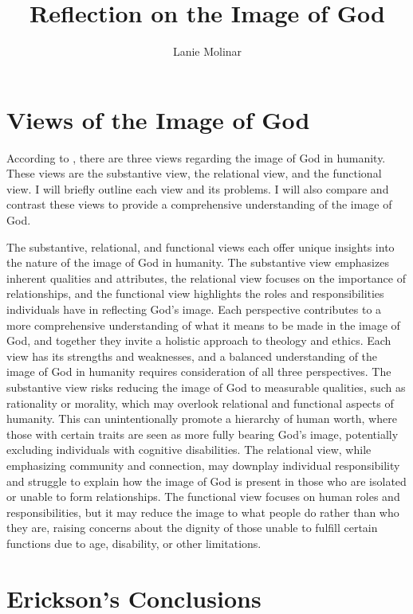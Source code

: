 \documentclass[stu,12pt,floatsintext]{apa7}
\title{Reflection on the Image of God}
\author{Lanie Molinar}
\begin{document}
\maketitle
\thispagestyle{plain}
\pagestyle{plain}

\section{Views of the Image of God}

According to \textcite[Chapter 18]{ericksonIntroducingChristianDoctrine2015}, there are three views regarding the image of God in humanity. These views are the substantive view, the relational view, and the functional view. I will briefly outline each view and its problems. I will also compare and contrast these views to provide a comprehensive understanding of the image of God.

The substantive, relational, and functional views each offer unique insights into the nature of the image of God in humanity. The substantive view emphasizes inherent qualities and attributes, the relational view focuses on the importance of relationships, and the functional view highlights the roles and responsibilities individuals have in reflecting God's image. Each perspective contributes to a more comprehensive understanding of what it means to be made in the image of God, and together they invite a holistic approach to theology and ethics. Each view has its strengths and weaknesses, and a balanced understanding of the image of God in humanity requires consideration of all three perspectives. The substantive view risks reducing the image of God to measurable qualities, such as rationality or morality, which may overlook relational and functional aspects of humanity. This can unintentionally promote a hierarchy of human worth, where those with certain traits are seen as more fully bearing God's image, potentially excluding individuals with cognitive disabilities. The relational view, while emphasizing community and connection, may downplay individual responsibility and struggle to explain how the image of God is present in those who are isolated or unable to form relationships. The functional view focuses on human roles and responsibilities, but it may reduce the image to what people do rather than who they are, raising concerns about the dignity of those unable to fulfill certain functions due to age, disability, or other limitations.

\section{Erickson’s Conclusions}
\end{document}

